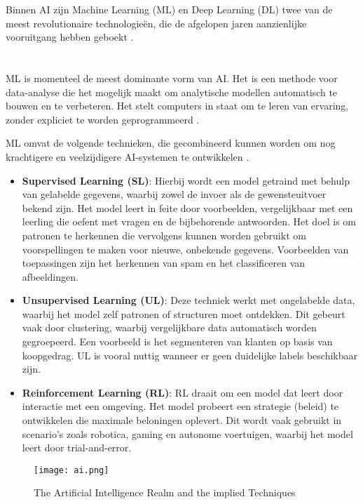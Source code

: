 Binnen AI zijn Machine Learning (ML) en Deep Learning (DL) twee van de meest revolutionaire technologieën, die de afgelopen jaren aanzienlijke vooruitgang hebben geboekt \autocite{SharifaniEtAl2023}.

\section{}%
\label{sec:machine-learning}

ML is momenteel de meest dominante vorm van AI. Het is een methode voor data-analyse die het mogelijk maakt om analytische modellen automatisch te bouwen en te verbeteren. Het stelt computers in staat om te leren van ervaring, zonder expliciet te worden geprogrammeerd \autocite{SharifaniEtAl2023}.

ML omvat de volgende technieken, die gecombineerd kunnen worden om nog krachtigere en veelzijdigere AI-systemen te ontwikkelen \autocite{Kouassi2023}. 

\begin{itemize}
  \item \textbf{Supervised Learning (SL)}: Hierbij wordt een model getraind met behulp van gelabelde gegevens, waarbij zowel de invoer als de gewensteuitvoer bekend zijn. Het model leert in feite door voorbeelden, vergelijkbaar met een leerling die oefent met vragen en de bijbehorende antwoorden. Het doel is om patronen te herkennen die vervolgens kunnen worden gebruikt om voorspellingen te maken voor nieuwe, onbekende gegevens. Voorbeelden van toepassingen zijn het herkennen van spam en het classificeren van afbeeldingen.
  \item \textbf{Unsupervised Learning (UL)}: Deze techniek werkt met ongelabelde data, waarbij het model zelf patronen of structuren moet ontdekken. Dit gebeurt vaak door clustering, waarbij vergelijkbare data automatisch worden gegroepeerd. Een voorbeeld is het segmenteren van klanten op basis van koopgedrag. UL is vooral nuttig wanneer er geen duidelijke labels beschikbaar zijn. 
  \item \textbf{Reinforcement Learning (RL)}: RL draait om een model dat leert door interactie met een omgeving. Het model probeert een strategie (beleid) te ontwikkelen die maximale beloningen oplevert. Dit wordt vaak gebruikt in scenario's zoals robotica, gaming en autonome voertuigen, waarbij het model leert door trial-and-error. 
\end{itemize}

\begin{figure}
  \centering
  \texttt{[image: ai.png]}
  \caption[Figure 1]{\label{fig:ai}The Artificial Intelligence Realm and the implied Techniques \autocite{Kouassi2023}}
\end{figure}

